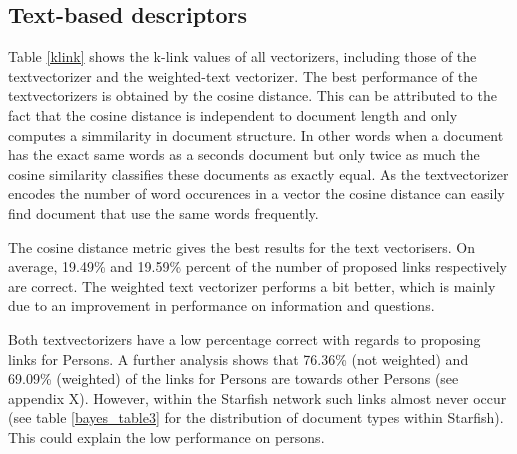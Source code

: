\subsection{Text-based descriptors}
Table \ref{klink} shows the k-link values of all vectorizers, including those of the textvectorizer and the weighted-text vectorizer. The best performance of the textvectorizers is obtained by the cosine distance. This can be attributed
 to the fact that the cosine distance is independent to document length and only
 computes a simmilarity in document structure. In other words when a document
 has the exact same words as a seconds document but only twice as much the
 cosine similarity classifies these documents as exactly equal. As the textvectorizer
 encodes the number of word occurences in a vector the cosine distance can 
 easily find document that use the same words frequently.

The cosine distance metric gives the best results for the text vectorisers. On average, 19.49\% and 19.59\% percent of the number of proposed links respectively are correct. The weighted text vectorizer performs a bit better, which is mainly due to an improvement in performance on information and questions. %

Both textvectorizers have a low percentage correct with regards to proposing links for Persons. A further analysis shows that 76.36\% (not weighted) and 69.09\% (weighted) of the links for Persons are towards other Persons (see appendix X). However, within the Starfish network such links almost never occur (see table \ref{bayes_table3} for the distribution of document types within Starfish). This could explain the low performance on persons. 

